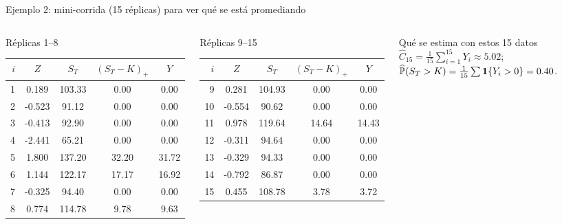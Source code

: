 \documentclass[aspectratio=1610, 9pt]{beamer}
\begin{document}
\begin{frame}{Ejemplo 2: mini-corrida (15 réplicas) para ver qué se está promediando}
\scriptsize
\begin{columns}[T]
\begin{block}{Réplicas 1--8}
\centering
\setlength{\tabcolsep}{4pt}
\begin{tabular}{@{}rcccc@{}}
\toprule
$i$ & $Z$ & $S_T$ & $(S_T-K)_+$ & $Y$ \\
\midrule
1 & 0.189 & 103.33 & 0.00 & 0.00 \\
2 & -0.523 & 91.12 & 0.00 & 0.00 \\
3 & -0.413 & 92.90 & 0.00 & 0.00 \\
4 & -2.441 & 65.21 & 0.00 & 0.00 \\
5 & 1.800 & 137.20 & 32.20 & 31.72 \\
6 & 1.144 & 122.17 & 17.17 & 16.92 \\
7 & -0.325 & 94.40 & 0.00 & 0.00 \\
8 & 0.774 & 114.78 & 9.78 & 9.63 \\
\bottomrule
\end{tabular}
\end{block}

\begin{block}{Réplicas 9--15}
\centering
\setlength{\tabcolsep}{4pt}
\begin{tabular}{@{}rcccc@{}}
\toprule
$i$ & $Z$ & $S_T$ & $(S_T-K)_+$ & $Y$ \\
\midrule
9 & 0.281 & 104.93 & 0.00 & 0.00 \\
10 & -0.554 & 90.62 & 0.00 & 0.00 \\
11 & 0.978 & 119.64 & 14.64 & 14.43 \\
12 & -0.311 & 94.64 & 0.00 & 0.00 \\
13 & -0.329 & 94.33 & 0.00 & 0.00 \\
14 & -0.792 & 86.87 & 0.00 & 0.00 \\
15 & 0.455 & 108.78 & 3.78 & 3.72 \\
\bottomrule
\end{tabular}
\end{block}

\begin{alertblock}{Qué se estima con estos 15 datos}
$\widehat{C}_{15}=\frac{1}{15}\sum_{i=1}^{15}Y_i \approx 5.02$;\quad
$\widehat{\mathbb{P}}(S_T>K)=\frac{1}{15}\sum \mathbf{1}\{Y_i>0\}=0.40$.
\end{alertblock}
\end{columns}
\end{frame}
\end{document}
